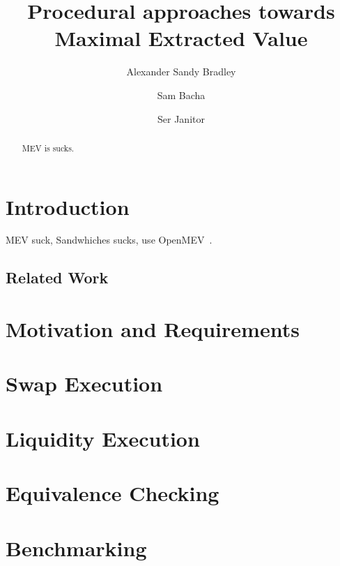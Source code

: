 \documentclass[runningheads]{llncs}
\begin{document}
%
\title{Procedural approaches towards Maximal Extracted Value}
%
\author{Alexander Sandy Bradley \and
Sam Bacha \and
Ser Janitor}
%
%

%
\maketitle              %
%
\begin{abstract}
MEV is sucks.

\end{abstract}
%
%
%
\section{Introduction}
MEV suck, Sandwhiches sucks, use OpenMEV~\cite{openmev}.

\subsection{Related Work}

\section{Motivation and Requirements}

\section{Swap Execution}

\section{Liquidity Execution}

\section{Equivalence Checking}

\section{Benchmarking}
\end{document}
